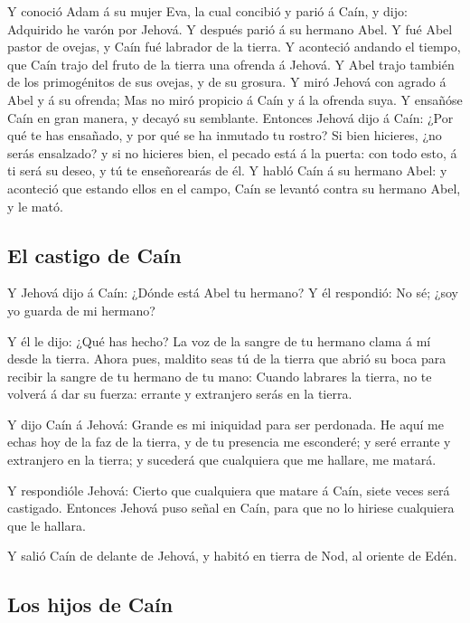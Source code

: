  Y conoció Adam á su mujer Eva, la cual concibió y parió á
Caín, y dijo: Adquirido he varón por Jehová.  Y después
parió á su hermano Abel. Y fué Abel pastor de ovejas, y Caín fué
labrador de la tierra.  Y aconteció andando el tiempo, que
Caín trajo del fruto de la tierra una ofrenda á Jehová.  Y
Abel trajo también de los primogénitos de sus ovejas, y de su grosura. Y
miró Jehová con agrado á Abel y á su ofrenda;  Mas no miró
propicio á Caín y á la ofrenda suya. Y ensañóse Caín en gran manera, y
decayó su semblante.  Entonces Jehová dijo á Caín: ¿Por
qué te has ensañado, y por qué se ha inmutado tu rostro? 
Si bien hicieres, ¿no serás ensalzado? y si no hicieres bien, el pecado
está á la puerta: con todo esto, á ti será su deseo, y tú te
enseñorearás de él.  Y habló Caín á su hermano Abel: y
aconteció que estando ellos en el campo, Caín se levantó contra su
hermano Abel, y le mató.

\hypertarget{el-castigo-de-cauxedn}{%
\subsection{El castigo de Caín}\label{el-castigo-de-cauxedn}}

 Y Jehová dijo á Caín: ¿Dónde está Abel tu hermano? Y él
respondió: No sé; ¿soy yo guarda de mi hermano?

 Y él le dijo: ¿Qué has hecho? La voz de la sangre de tu
hermano clama á mí desde la tierra.  Ahora pues, maldito
seas tú de la tierra que abrió su boca para recibir la sangre de tu
hermano de tu mano:  Cuando labrares la tierra, no te
volverá á dar su fuerza: errante y extranjero serás en la tierra.

 Y dijo Caín á Jehová: Grande es mi iniquidad para ser
perdonada.  He aquí me echas hoy de la faz de la tierra,
y de tu presencia me esconderé; y seré errante y extranjero en la
tierra; y sucederá que cualquiera que me hallare, me matará.

 Y respondióle Jehová: Cierto que cualquiera que matare á
Caín, siete veces será castigado. Entonces Jehová puso señal en Caín,
para que no lo hiriese cualquiera que le hallara.

 Y salió Caín de delante de Jehová, y habitó en tierra de
Nod, al oriente de Edén.

\hypertarget{los-hijos-de-cauxedn}{%
\subsection{Los hijos de Caín}\label{los-hijos-de-cauxedn}}

